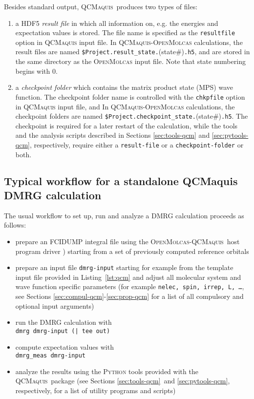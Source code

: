 \documentclass[bibliography=totoc,12pt,a4paper]{scrartcl}
\newcommand{\mol}{\textsc{OpenMolcas}}
\newcommand{\qcm}{\textsc{QCMaquis}}
\newcommand{\kwd}[1]{\texttt{#1}}
\begin{document}
Besides standard output, \qcm\ produces two types of files:
\begin{enumerate}
 \item a HDF5 \emph{result file} in which all information on, e.g. the energies and expectation values is stored. The file name is specified as the \kwd{resultfile} option in \qcm{} input file. In \qcm{}-\mol{} calculations, the result files are named \texttt{\$Project.result\_state.}(state\#)\texttt{.h5}, and are stored in the same directory as the \mol{} input file. Note that state numbering begins with 0.
 \item a \emph{checkpoint folder} which contains the matrix product state (MPS) wave function. The checkpoint folder name is controlled with the \kwd{chkpfile} option in \qcm{} input file, and In \qcm{}-\mol{} calculations, the checkpoint folders are named \texttt{\$Project.checkpoint\_state.}(state\#)\texttt{.h5}. The checkpoint is required for a later restart of the calculation, while the tools and the analysis scripts
described in Sections \ref{sec:tools-qcm} and \ref{sec:pytools-qcm}, respectively, require either a \texttt{result-file} or a
\texttt{checkpoint-folder} or both.
\end{enumerate}

\subsection{Typical workflow for a standalone QCMaquis DMRG calculation}\label{sec:workflow-qcm}
The usual workflow to set up, run and analyze a DMRG calculation proceeds as follows:
\begin{itemize}
   \item prepare an FCIDUMP integral file using the \mol-\qcm\ host
   program driver \cite{interface}) starting from a set of previously computed reference orbitals
   \item prepare an input file \texttt{dmrg-input} starting for example from the template input file provided in Listing~\ref{lst:qcm} and adjust all molecular system and wave function specific parameters (for example \texttt{nelec, spin,
   irrep, L, \ldots}, see Sections \ref{sec:compul-qcm}-\ref{sec:prop-qcm} for a list of all compulsory and optional input arguments)
   \item run the DMRG calculation with\\
\texttt{dmrg dmrg-input (| tee out)}
   \item compute expectation values with\\
\texttt{dmrg\_meas dmrg-input}
   \item analyze the results using the \textsc{Python} tools provided with the \qcm\ package (see Sections \ref{sec:tools-qcm}\ and
   \ref{sec:pytools-qcm}, respectively, for a list of utility programs and scripts)
\end{itemize}
\end{document}
